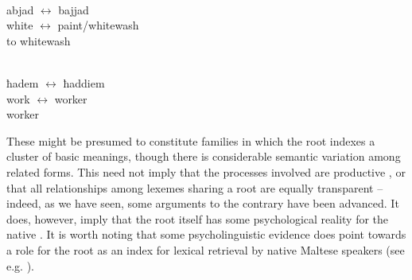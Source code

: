 \documentclass[output=paper]{LSP/langsci}
\begin{document}
\ea\label{ex:form}
\\
\gll abjad $\leftrightarrow$ bajjad\\
     white $\leftrightarrow$ paint/whitewash\\
\glt to whitewash
\z     

\ea\label{ex:deverbal}
\\
\gll ħadem $\leftrightarrow$ ħaddiem\\
work $\leftrightarrow$ worker\\
\glt worker
\z
 
These might be presumed to constitute families in which the root indexes a cluster of basic meanings, though there is considerable semantic variation among related forms. This need not imply that the processes involved are productive \citep{Mifsud1995productivity,Hoberman2003}, or that all relationships among lexemes sharing a root are equally transparent -- indeed, as we have seen, some arguments to the contrary have been advanced. It does, however, imply that the root itself has some psychological reality for the native . It is worth noting that some psycholinguistic evidence does point towards a role for the root as an index for lexical retrieval by native Maltese speakers (see e.g. \citealt{Twist2006,Ussishkin2015}).

\end{document}
